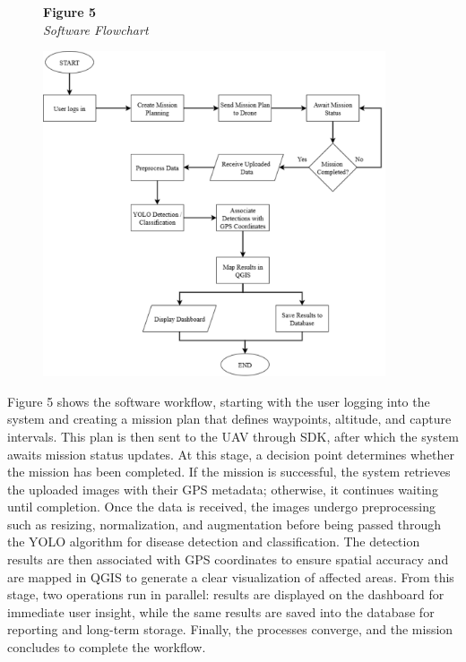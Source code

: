 \begin{figure}[H]
	\raggedright
	\textbf{Figure 5} \\ %
	\textit{Software Flowchart} %

	\vspace{0.5em}
	\centering
	\includegraphics[width=0.9\textwidth]{figures/Soft_Flow.pdf} %

	\vspace{0.5em}
	\raggedright

	\label{fig:SoftFlow}
\end{figure}

Figure 5 shows the software workflow, starting with the user logging into the system and creating a mission plan that defines waypoints, altitude, and capture intervals. This plan is then sent to the UAV through SDK, after which the system awaits mission status updates. At this stage, a decision point determines whether the mission has been completed. If the mission is successful, the system retrieves the uploaded images with their GPS metadata; otherwise, it continues waiting until completion. Once the data is received, the images undergo preprocessing such as resizing, normalization, and augmentation before being passed through the YOLO algorithm for disease detection and classification. The detection results are then associated with GPS coordinates to ensure spatial accuracy and are mapped in QGIS to generate a clear visualization of affected areas. From this stage, two operations run in parallel: results are displayed on the dashboard for immediate user insight, while the same results are saved into the database for reporting and long-term storage. Finally, the processes converge, and the mission concludes to complete the workflow.

